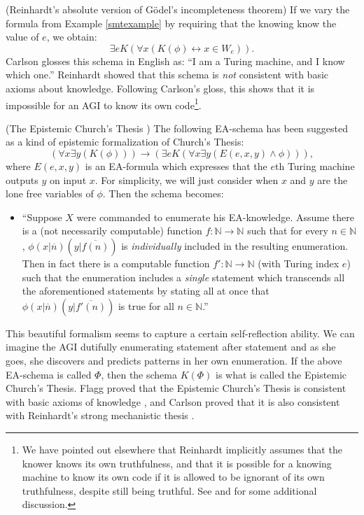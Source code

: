 \documentclass[runningheads]{llncs}
\begin{document}
\begin{example}
\label{reinhardtnegativeexample}
  (Reinhardt's absolute version of G\"odel's incompleteness theorem)
  If we vary the formula from Example \ref{smtexample} by requiring that the
  knowing know the value of $e$, we obtain:
  \[
    \exists e K(\forall x ( K(\phi) \leftrightarrow x\in W_e)).
  \]
  Carlson \cite{carlson} glosses this schema in English as:
  ``I am a Turing machine, and I know which one.''
  Reinhardt showed that this schema is \emph{not} consistent with basic
  axioms about knowledge. Following Carlson's gloss, this shows
  that it is impossible for an AGI to know its own code\footnote{We have
  pointed out elsewhere \cite{alexander2014machine} that Reinhardt
  implicitly assumes that the knower knows its own truthfulness, and that
  it is possible for a knowing machine to know its own code if it is allowed to
  be ignorant of its own truthfulness, despite still being truthful.
  See \cite{aldini2015self} and \cite{aldini2015theory} for some additional discussion.}.
\end{example}

\begin{example}
\label{ectexample}
  (The Epistemic Church's Thesis \cite{flagg1985church} \cite{carlson2016collapsing})
  The following EA-schema has been suggested as a kind of epistemic formalization
  of Church's Thesis:
  \[
  ( \forall x\exists y (K(\phi))  ) \rightarrow
  ( \exists e K( \forall x\exists y ( E(e,x,y) \wedge \phi  )  )  ),
  \]
  where $E(e,x,y)$ is an EA-formula which expresses that the $e$th Turing machine
  outputs $y$ on input $x$.
  For simplicity, we will just consider when $x$ and $y$ are the lone free variables
  of $\phi$.
  Then the schema becomes:
  \begin{itemize}
    \item
    ``Suppose $X$ were commanded to enumerate his EA-knowledge.
    Assume there is a (not necessarily computable) function
    $f:\mathbb N\to\mathbb N$ such that for every $n\in\mathbb N$,
    $\phi(x|\overline n)(y|\overline{f(n)})$ is \emph{individually}
    included in the resulting enumeration.
    Then in fact there is a computable
    function $f':\mathbb N\to\mathbb N$ (with Turing index $e$)
    such that the enumeration includes
    a \emph{single} statement which transcends all the aforementioned statements
    by stating all at once that $\phi(x|\overline n)(y|\overline{f'(n)})$
    is true for all $n\in\mathbb N$.''
  \end{itemize}
  This beautiful formalism seems to capture a certain self-reflection ability.
  We can imagine the AGI dutifully enumerating statement after statement and
  as she goes, she discovers and predicts patterns in her own enumeration.
  If the above EA-schema is called $\Phi$, then the schema $K(\Phi)$ is what is called
  the Epistemic Church's Thesis.
  Flagg proved that the Epistemic Church's Thesis is
  consistent with basic axioms of knowledge \cite{flagg1985church},
  and Carlson proved that it is also consistent with
  Reinhardt's strong mechanistic thesis \cite{carlson2016collapsing}.
\end{example}
\end{document}
